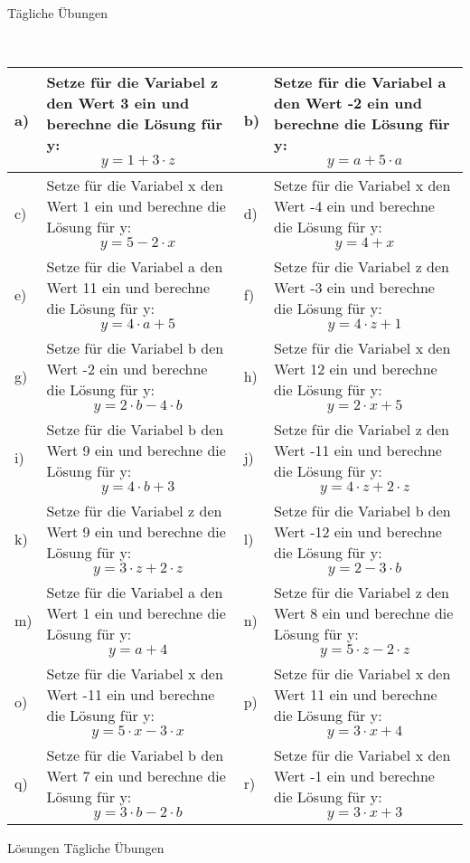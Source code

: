 \documentclass[12pt]{article}
\begin{document}
\centerline{{\Large Tägliche Übungen}} 
\vspace{1cm}
\noindent \\


\begin{xltabular}{\textwidth}{|C{0.75cm}|X|C{0.75cm}|X|}
\hline
a)&Setze für die Variabel z den Wert 3 ein und berechne die Lösung für y:$$y=1 + 3 \cdot z$$
&
b)&Setze für die Variabel a den Wert -2 ein und berechne die Lösung für y:$$y=a + 5 \cdot a$$
\\\hline
c)&Setze für die Variabel x den Wert 1 ein und berechne die Lösung für y:$$y=5 - 2 \cdot x$$
&
d)&Setze für die Variabel x den Wert -4 ein und berechne die Lösung für y:$$y=4 + x$$
\\\hline
e)&Setze für die Variabel a den Wert 11 ein und berechne die Lösung für y:$$y=4 \cdot a + 5$$
&
f)&Setze für die Variabel z den Wert -3 ein und berechne die Lösung für y:$$y=4 \cdot z + 1$$
\\\hline
g)&Setze für die Variabel b den Wert -2 ein und berechne die Lösung für y:$$y=2 \cdot b - 4 \cdot b$$
&
h)&Setze für die Variabel x den Wert 12 ein und berechne die Lösung für y:$$y=2 \cdot x + 5$$
\\\hline
i)&Setze für die Variabel b den Wert 9 ein und berechne die Lösung für y:$$y=4 \cdot b + 3$$
&
j)&Setze für die Variabel z den Wert -11 ein und berechne die Lösung für y:$$y=4 \cdot z + 2 \cdot z$$
\\\hline
k)&Setze für die Variabel z den Wert 9 ein und berechne die Lösung für y:$$y=3 \cdot z + 2 \cdot z$$
&
l)&Setze für die Variabel b den Wert -12 ein und berechne die Lösung für y:$$y=2 - 3 \cdot b$$
\\\hline
m)&Setze für die Variabel a den Wert 1 ein und berechne die Lösung für y:$$y=a + 4$$
&
n)&Setze für die Variabel z den Wert 8 ein und berechne die Lösung für y:$$y=5 \cdot z - 2 \cdot z$$
\\\hline
o)&Setze für die Variabel x den Wert -11 ein und berechne die Lösung für y:$$y=5 \cdot x - 3 \cdot x$$
&
p)&Setze für die Variabel x den Wert 11 ein und berechne die Lösung für y:$$y=3 \cdot x + 4$$
\\\hline
q)&Setze für die Variabel b den Wert 7 ein und berechne die Lösung für y:$$y=3 \cdot b - 2 \cdot b$$
&
r)&Setze für die Variabel x den Wert -1 ein und berechne die Lösung für y:$$y=3 \cdot x + 3$$
\\\hline
\end{xltabular}
\vspace{0.5cm}
\newpage
{}
\centerline{{\large Lösungen Tägliche Übungen}} 
\vspace{0.5cm}
\end{document}
